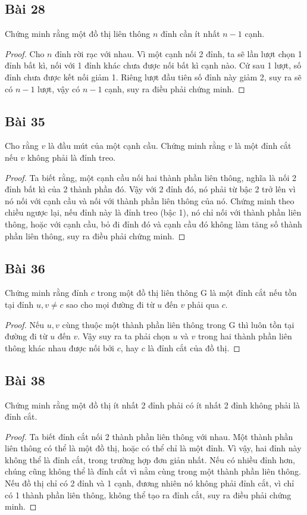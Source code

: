 \subsection*{Bài 28}
Chứng minh rằng một đồ thị liên thông $n$ đỉnh cần ít nhất $n-1$ cạnh.
\begin{proof}
Cho $n$ đỉnh rời rạc với nhau. Vì một cạnh nối 2 đỉnh, ta sẽ lần lượt chọn 1 đỉnh bất kì, nối với 1 đỉnh khác chưa được nối bất kì cạnh nào. Cứ sau 1 lượt, số đỉnh chưa được kết nối giảm 1. Riêng lượt đầu tiên số đỉnh này giảm 2, suy ra sẽ có $n-1$ lượt, vậy có $n-1$ cạnh, suy ra điều phải chứng minh.
\end{proof}
\subsection*{Bài 35}
Cho rằng $v$ là đầu mút của một cạnh cầu. Chứng minh rằng $v$ là một đỉnh cắt nếu $v$ không phải là đỉnh treo.
\begin{proof}
Ta biết rằng, một cạnh cầu nối hai thành phần liên thông, nghĩa là nối 2 đỉnh bất kì của 2 thành phần đó. Vậy với 2 đỉnh đó, nó phải từ bậc 2 trở lên vì nó nối với cạnh cầu và nối với thành phần liên thông của nó. Chứng minh theo chiều ngược lại, nếu đỉnh này là đỉnh treo (bậc 1), nó chỉ nối với thành phần liên thông, hoặc với cạnh cầu, bỏ đi đỉnh đó và cạnh cầu đó không làm tăng số thành phần liên thông, suy ra điều phải chứng minh.
\end{proof}
\subsection*{Bài 36}
Chứng minh rằng đỉnh $c$ trong một đồ thị liên thông G là một đỉnh cắt nếu tồn tại đỉnh $u,v\neq c$ sao cho mọi đường đi từ $u$ đến $v$ phải qua $c$.
\begin{proof}
Nếu $u,v$ cùng thuộc một thành phần liên thông trong G thì luôn tồn tại đường đi từ $u$ đến $v$. Vậy suy ra ta phải chọn $u$ và $v$ trong hai thành phần liên thông khác nhau được nối bởi $c$, hay $c$ là đỉnh cắt của đồ thị.
\end{proof}
\subsection*{Bài 38}
Chứng minh rằng một đồ thị ít nhất 2 đỉnh phải có ít nhất 2 đỉnh không phải là đỉnh cắt.
\begin{proof}
Ta biết đỉnh cắt nối 2 thành phần liên thông với nhau. Một thành phần liên thông có thể là một đồ thị, hoặc có thể chỉ là một đỉnh. Vì vậy, hai đỉnh này không thể là đỉnh cắt, trong trường hợp đơn giản nhất. Nếu có nhiều đỉnh hơn, chúng cũng không thể là đỉnh cắt vì nằm cùng trong một thành phần liên thông. Nếu đồ thị chỉ có 2 đỉnh và 1 cạnh, đương nhiên nó không phải đỉnh cắt, vì chỉ có 1 thành phần liên thông, không thể tạo ra đỉnh cắt, suy ra điều phải chứng minh.
\end{proof}

